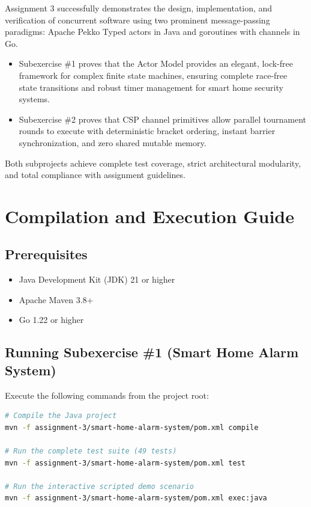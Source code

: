 \documentclass[11pt,a4paper]{article}
\begin{document}
Assignment 3 successfully demonstrates the design, implementation, and verification of concurrent software using two prominent message-passing paradigms: Apache Pekko Typed actors in Java and goroutines with channels in Go.

\begin{itemize}[leftmargin=*]
    \item Subexercise \#1 proves that the Actor Model provides an elegant, lock-free framework for complex finite state machines, ensuring complete race-free state transitions and robust timer management for smart home security systems.
    \item Subexercise \#2 proves that CSP channel primitives allow parallel tournament rounds to execute with deterministic bracket ordering, instant barrier synchronization, and zero shared mutable memory.
\end{itemize}

Both subprojects achieve complete test coverage, strict architectural modularity, and total compliance with assignment guidelines.

\section{Compilation and Execution Guide}

\subsection{Prerequisites}
\begin{itemize}[leftmargin=*]
    \item Java Development Kit (JDK) 21 or higher
    \item Apache Maven 3.8+
    \item Go 1.22 or higher
\end{itemize}

\subsection{Running Subexercise \#1 (Smart Home Alarm System)}

Execute the following commands from the project root:

\begin{lstlisting}[language=bash, caption={Build and execution commands for Subexercise \#1}]
# Compile the Java project
mvn -f assignment-3/smart-home-alarm-system/pom.xml compile

# Run the complete test suite (49 tests)
mvn -f assignment-3/smart-home-alarm-system/pom.xml test

# Run the interactive scripted demo scenario
mvn -f assignment-3/smart-home-alarm-system/pom.xml exec:java
\end{lstlisting}
\end{document}
